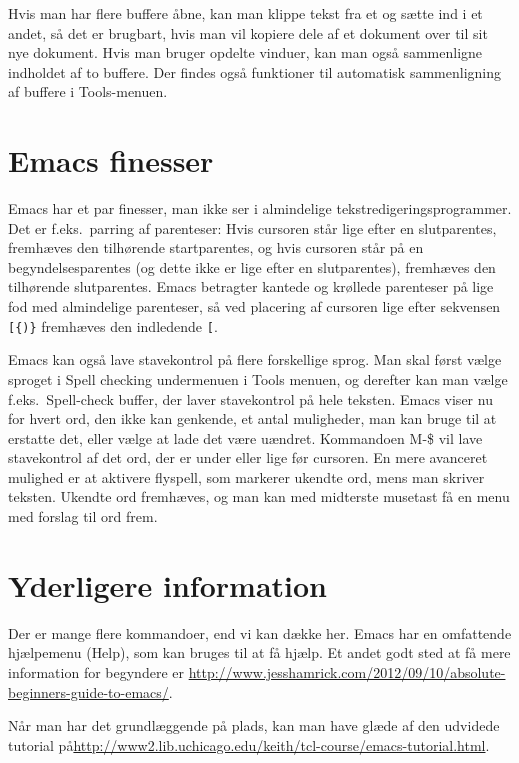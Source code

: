 \documentclass[a4paper]{article}
\begin{document}
Hvis man har flere buffere åbne, kan man klippe tekst fra et og sætte
ind i et andet, så det er brugbart, hvis man vil kopiere dele af et
dokument over til sit nye dokument.  Hvis man bruger opdelte vinduer,
kan man også sammenligne indholdet af to buffere.  Der findes også
funktioner til automatisk sammenligning af buffere i
\textsf{Tools}-menuen.

\section{Emacs finesser}

Emacs har et par finesser, man ikke ser i almindelige
tekstredigeringsprogrammer.  Det er f.eks.\ parring af parenteser:
Hvis cursoren står lige efter en slutparentes, fremhæves den
tilhørende startparentes, og hvis cursoren står på en
begyndelsesparentes (og dette ikke er lige efter en slutparentes),
fremhæves den tilhørende slutparentes.  Emacs betragter kantede og
krøllede parenteser på lige fod med almindelige parenteser, så ved
placering af cursoren lige efter sekvensen \verb|[{)}| fremhæves den
indledende \verb|[|.

Emacs kan også lave stavekontrol på flere forskellige sprog.  Man skal
først vælge sproget i \textsf{Spell checking} undermenuen i
\textsf{Tools} menuen, og derefter kan man vælge
f.eks.\ \textsf{Spell-check buffer}, der laver stavekontrol på hele
teksten. Emacs viser nu for hvert ord, den ikke kan genkende, et antal
muligheder, man kan bruge til at erstatte det, eller vælge at lade det
være uændret.  Kommandoen \textsf{M-\$} vil lave stavekontrol af det
ord, der er under eller lige før cursoren.  En mere avanceret mulighed
er at aktivere \textsf{flyspell}, som markerer ukendte ord, mens man
skriver teksten.  Ukendte ord fremhæves, og man kan med midterste
musetast få en menu med forslag til ord frem.

\section{Yderligere information}

Der er mange flere kommandoer, end vi kan dække her.  Emacs har en
omfattende hjælpemenu (\textsf{Help}), som kan bruges til at få hjælp.
Et andet godt sted at få mere information for begyndere er
\url{http://www.jesshamrick.com/2012/09/10/absolute-beginners-guide-to-emacs/}.

Når man har det grundlæggende på plads, kan man have glæde af den udvidede tutorial på\newline \url{http://www2.lib.uchicago.edu/keith/tcl-course/emacs-tutorial.html}.
\end{document}
